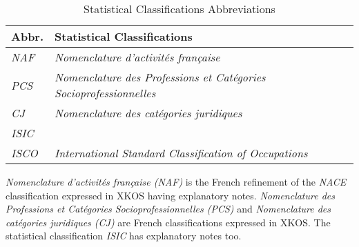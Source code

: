 \documentclass{llncs}
\newcommand*\rot{\rotatebox{90}}
\begin{document}
\begin{table}[H]
	\centering
		\begin{tabular}{l|l}
      \textbf{Abbr.} & \textbf{Statistical Classifications} \\		
      \hline
    \emph{NAF} & \emph{Nomenclature d'activités française}\tablefootnote{\url{http://rdf.insee.fr/codes/index.html}} \\
		\emph{PCS} & \emph{Nomenclature des Professions et Catégories Socioprofessionnelles}\tablefootnote{\url{http://rdf.insee.fr/codes/index.html}} \\
		\emph{CJ} & \emph{Nomenclature des catégories juridiques}\tablefootnote{\url{http://rdf.insee.fr/codes/index.html}} \\
		\emph{ISIC} & \\
		\emph{ISCO} & \emph{International Standard Classification of Occupations} \\
		\end{tabular}
	\caption{Statistical Classifications Abbreviations}
	\label{tab:statistical-classifications-abbreviations}
\end{table}

\emph{Nomenclature d'activités française (NAF)} is the French refinement of the \emph{NACE} classification expressed in XKOS having explanatory notes.
\emph{Nomenclature des Professions et Catégories Socioprofessionnelles (PCS)} and \emph{Nomenclature des catégories juridiques (CJ)} are French classifications expressed in XKOS.
The statistical classification \emph{ISIC} has explanatory notes too. 

\end{document}
